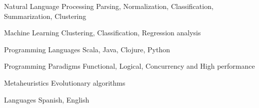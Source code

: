 


\begin{cvskills}


\cvskill
{Natural Language Processing} %
{Parsing, Normalization, Classification, Summarization, Clustering} %


\cvskill
{Machine Learning} %
{Clustering, Classification, Regression analysis} %


\cvskill
{Programming Languages} %
{Scala, Java, Clojure, Python} %


\cvskill
{Programming Paradigms} %
{Functional, Logical, Concurrency and High performance} %


\cvskill
{Metaheuristics} %
{Evolutionary algorithms} %


\cvskill
{Languages} %
{Spanish, English} %




\end{cvskills}

